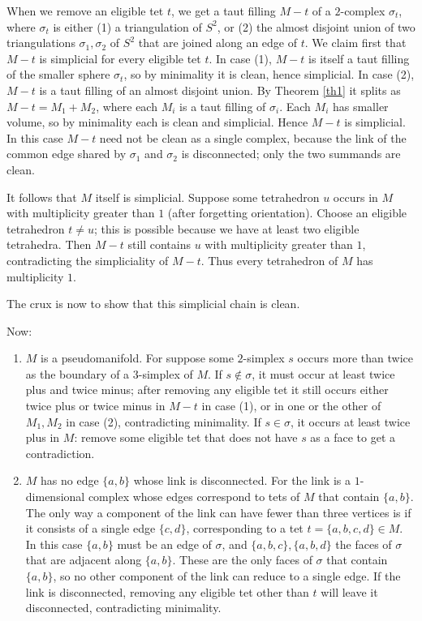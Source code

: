 \documentclass[12pt]{article}
\begin{document}
{When we remove an eligible tet $t$,
we get a taut filling $M-t$ of
a $2$-complex $\sigma_t$,
where $\sigma_t$ is either
(1) a triangulation of $S^2$,
or (2) the almost disjoint union of
two triangulations $\sigma_1,\sigma_2$ of $S^2$
that are joined along an edge of $t$.
We claim first that $M-t$ is simplicial for every eligible tet $t$.
In case (1), $M-t$ is itself a taut filling of the smaller sphere
$\sigma_t$, so by minimality it is clean, hence simplicial.
In case (2), $M-t$ is a taut filling of an almost disjoint union.
By Theorem \ref{th1} it splits as
$M-t=M_1+M_2$, where each $M_i$ is a taut filling of $\sigma_i$.
Each $M_i$ has smaller volume, so by minimality each is clean and
simplicial.  Hence $M-t$ is simplicial.  In this case $M-t$ need not be
clean as a single complex, because the link of the common edge shared by
$\sigma_1$ and $\sigma_2$ is disconnected; only the two summands are clean.

It follows that $M$ itself is simplicial.  Suppose some tetrahedron $u$
occurs in $M$ with multiplicity greater than $1$ (after forgetting
orientation).  Choose an eligible tetrahedron $t\ne u$; this is possible
because we have at least two eligible tetrahedra.  Then $M-t$ still
contains $u$ with multiplicity greater than $1$, contradicting the
simpliciality of $M-t$.  Thus every tetrahedron of $M$ has multiplicity
$1$.

The crux is now to show that this simplicial chain is clean.

Now:

\begin{enumerate}

\item
$M$ is a pseudomanifold.
For suppose some $2$-simplex $s$ occurs more than twice as the boundary
of a $3$-simplex of $M$.
If $s \notin \sigma$,
it must occur at least twice plus and twice minus;
after removing any eligible tet it
still occurs either twice plus or twice minus in $M-t$ in case (1),
or in one or the other of $M_1,M_2$ in case (2),
contradicting minimality.
If $s \in \sigma$,
it occurs at least twice plus in $M$:
remove some eligible tet that does not have $s$ as a face
to get a contradiction.

\item
$M$ has no edge $\{a,b\}$ whose link
is disconnected.
For the link is a $1$-dimensional complex whose edges correspond to
tets of $M$ that contain $\{a,b\}$.
The only way a component of the link can have fewer than three
vertices is if it consists of a single edge $\{c,d\}$, corresponding
to a tet $t=\{a,b,c,d\} \in M$.
In this case $\{a,b\}$ must be an edge of $\sigma$,
and $\{a,b,c\},\{a,b,d\}$ the faces of $\sigma$
that are adjacent along $\{a,b\}$.
These are the only faces of $\sigma$ that contain $\{a,b\}$,
so no other component of the link can reduce to a single edge.
If the link is disconnected, removing any eligible tet
other than $t$ will
leave it disconnected, contradicting minimality.


\end{enumerate}}
\end{document}
